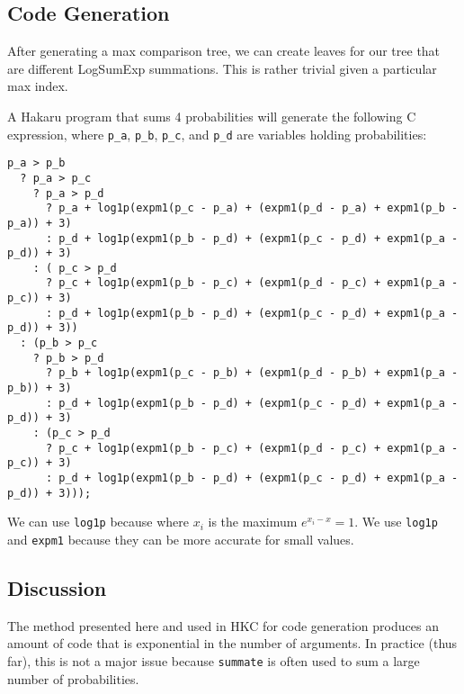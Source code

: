 \documentclass[12pt]{article}
\begin{document}
\subsection*{Code Generation}

After generating a max comparison tree, we can create leaves for our tree that
are different LogSumExp summations. This is rather trivial given a particular
max index.


A Hakaru program that sums 4 probabilities will generate the following C
expression, where {\tt p\_a}, {\tt p\_b}, {\tt p\_c}, and {\tt p\_d} are
variables holding probabilities:

{\small
\begin{verbatim}
p_a > p_b
  ? p_a > p_c
    ? p_a > p_d
      ? p_a + log1p(expm1(p_c - p_a) + (expm1(p_d - p_a) + expm1(p_b - p_a)) + 3)
      : p_d + log1p(expm1(p_b - p_d) + (expm1(p_c - p_d) + expm1(p_a - p_d)) + 3)
    : ( p_c > p_d
      ? p_c + log1p(expm1(p_b - p_c) + (expm1(p_d - p_c) + expm1(p_a - p_c)) + 3)
      : p_d + log1p(expm1(p_b - p_d) + (expm1(p_c - p_d) + expm1(p_a - p_d)) + 3))
  : (p_b > p_c
    ? p_b > p_d
      ? p_b + log1p(expm1(p_c - p_b) + (expm1(p_d - p_b) + expm1(p_a - p_b)) + 3)
      : p_d + log1p(expm1(p_b - p_d) + (expm1(p_c - p_d) + expm1(p_a - p_d)) + 3)
    : (p_c > p_d
      ? p_c + log1p(expm1(p_b - p_c) + (expm1(p_d - p_c) + expm1(p_a - p_c)) + 3)
      : p_d + log1p(expm1(p_b - p_d) + (expm1(p_c - p_d) + expm1(p_a - p_d)) + 3)));
\end{verbatim}
}

We can use {\tt log1p} because where $x_i$ is the maximum
$e^{x_i - \hat x} = 1$. We use {\tt log1p} and {\tt expm1} because they can be
more accurate for small values.

\subsection*{Discussion}

The method presented here and used in HKC for code generation produces an amount
of code that is exponential in the number of arguments. In practice (thus far),
this is not a major issue because {\tt summate} is often used to sum a large
number of probabilities.
\end{document}
